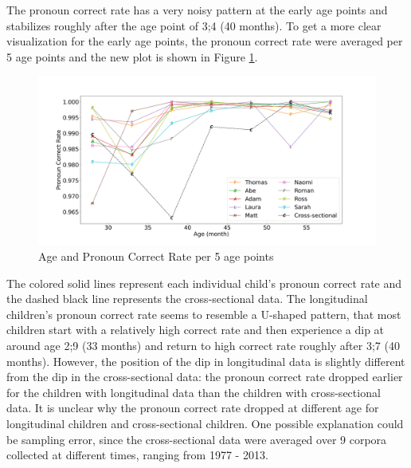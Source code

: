 The pronoun correct rate has a very noisy pattern at the early age points and stabilizes roughly after the age point of 3;4 (40 months). To get a more clear visualization for the early age points, the pronoun correct rate were averaged per 5 age points and the new plot is shown in Figure \ref{fig:2}.
\FloatBarrier
\begin{figure}[h]
\includegraphics[scale = 0.35, width = \linewidth]{graph/Age5month.png}
\vspace{-2em}
\caption{Age and Pronoun Correct Rate per 5 age points}
\label{fig:2}
\end{figure}
\FloatBarrier
The colored solid lines represent each individual child's pronoun correct rate and the dashed black line represents the cross-sectional data. The longitudinal children's pronoun correct rate seems to resemble a U-shaped pattern, that most children start with a relatively high correct rate and then experience a dip at around age 2;9 (33 months) and return to high correct rate roughly after 3;7 (40 months). However, the position of the dip in longitudinal data is slightly different from the dip in the cross-sectional data: the pronoun correct rate dropped earlier for the children with longitudinal data than the children with cross-sectional data. It is unclear why the pronoun correct rate dropped at different age for longitudinal children and cross-sectional children. One possible explanation could be sampling error, since the cross-sectional data were averaged over 9 corpora collected at different times, ranging from 1977 - 2013. 

